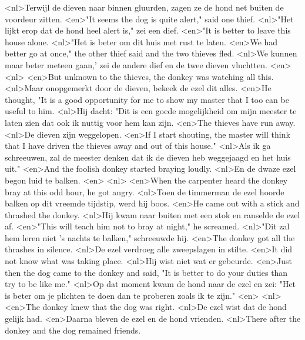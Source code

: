 <nl>Terwijl de dieven naar binnen gluurden, zagen ze de hond net buiten de voordeur zitten.
<en>"It seems the dog is quite alert," said one thief.
<nl>"Het lijkt erop dat de hond heel alert is," zei een dief.
<en>"It is better to leave this house alone.
<nl>"Het is beter om dit huis met rust te laten.
<en>We had better go at once," the other thief said and the two thieves fled.
<nl>We kunnen maar beter meteen gaan,' zei de andere dief en de twee dieven vluchtten.
<en>
<nl>
<en>But unknown to the thieves, the donkey was watching all this.
<nl>Maar onopgemerkt door de dieven, bekeek de ezel dit alles.
<en>He thought, "It is a good opportunity for me to show my master that I too can be useful to him.
<nl>Hij dacht: "Dit is een goede mogelijkheid om mijn meester te laten zien dat ook ik nuttig voor hem kan zijn.
<en>The thieves have run away.
<nl>De dieven zijn weggelopen.
<en>If I start shouting, the master will think that I have driven the thieves away and out of this house."
<nl>Als ik ga schreeuwen, zal de meester denken dat ik de dieven heb weggejaagd en het huis uit."
<en>And the foolish donkey started braying loudly.
<nl>En de dwaze ezel begon luid te balken.
<en>
<nl>
<en>When the carpenter heard the donkey bray at this odd hour, he got angry.
<nl>Toen de timmerman  de ezel  hoorde balken op dit vreemde tijdstip, werd hij boos.
<en>He came out with a stick and thrashed the donkey.
<nl>Hij kwam naar buiten met een stok en ranselde de ezel af.
<en>"This will teach him not to bray at night," he screamed.
<nl>"Dit zal hem leren niet 's nachts te balken," schreeuwde hij.
<en>The donkey got all the thrashes in silence.
<nl>De ezel verdroeg alle zweepslagen in stilte.
<en>It did not know what was taking place.
<nl>Hij wist niet wat er gebeurde.
<en>Just then the dog came to the donkey and said, "It is better to do your duties than try to be like me."
<nl>Op dat moment kwam de hond naar de ezel en zei: "Het is beter om je plichten te doen dan te proberen zoals ik te zijn."
<en>
<nl>
<en>The donkey knew that the dog was right. 
<nl>De ezel wist dat de hond gelijk had. 
<en>Daarna bleven de ezel en de hond vrienden.
<nl>There after  the donkey and the dog remained friends.
